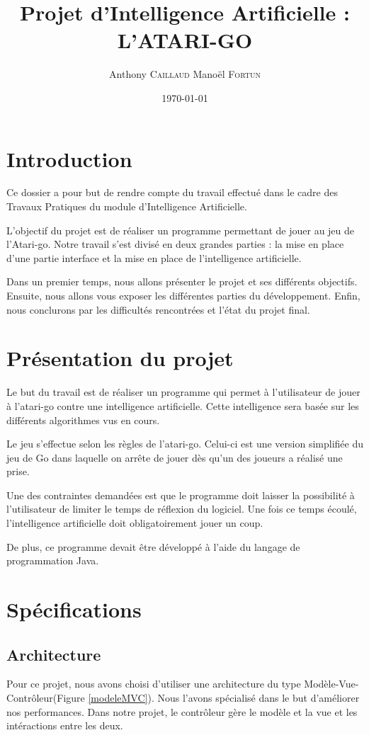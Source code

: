 \documentclass[11pt,a4paper]{article}
\title{Projet d'Intelligence Artificielle : L'ATARI-GO}
\author{Anthony \textsc{Caillaud} Manoël \textsc{Fortun}}
\date{\today}
\begin{document}
	\maketitle
	\clearpage
	\tableofcontents
	\clearpage

\section{Introduction}
Ce dossier a pour but de rendre compte du travail effectué dans le cadre des
Travaux Pratiques du module d'Intelligence Artificielle.

 L'objectif du projet est de réaliser un programme permettant de jouer au jeu
 de l'Atari-go. Notre travail s'est divisé en deux grandes parties : 
 la mise en place d'une partie interface et la mise en place de l'intelligence 
 artificielle.

Dans un premier temps, nous allons présenter le projet et ses
différents objectifs. Ensuite, nous allons vous exposer les
différentes parties du développement. Enfin, nous conclurons par les
difficultés rencontrées et l'état du projet final.
\clearpage	

\section{Présentation du projet}
Le but du travail est de réaliser un programme qui permet à l'utilisateur de
jouer à l’atari-go contre une intelligence artificielle. Cette intelligence
sera basée sur les différents algorithmes vus en cours.

Le jeu s'effectue selon les règles de l'atari-go. Celui-ci est une version
simplifiée du jeu de Go dans laquelle on arrête de jouer dès qu’un des joueurs
a réalisé une prise.

Une des contraintes demandées est que le programme doit laisser la possibilité
à l'utilisateur de limiter le temps de réflexion du logiciel. Une
fois ce temps écoulé, l'intelligence artificielle doit obligatoirement jouer un
coup.

De plus, ce programme devait être développé à l'aide du langage de
programmation Java.
\clearpage
\section{Spécifications}
	\subsection{Architecture}
	Pour ce projet, nous avons choisi d'utiliser une architecture du type
	Modèle-Vue-Contrôleur(Figure \ref{modeleMVC}). Nous l'avons spécialisé dans le
	but d'améliorer nos performances. Dans notre projet, le contrôleur gère le
	modèle et la vue et les intéractions entre les deux.
	
\end{document}

